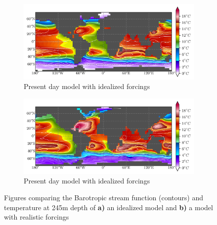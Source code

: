 \documentclass[a4paper]{article}
\begin{document}
\begin{figure}[H]
\begin{subfigure}{1\textwidth}
	\includegraphics[width=\linewidth]{compare/bsf_idealized}
	\caption{Present day model with idealized forcings}
\end{subfigure}
\begin{subfigure}{1\textwidth}
	\includegraphics[width=\linewidth]{compare/bsf_good_forcing}
	\caption{Present day model with idealized forcings}
\end{subfigure}
\caption{Figures comparing the Barotropic stream function (contours) and temperature at 245m depth of \textbf{a)} an idealized model and \textbf{b)} a model with realistic forcings}
\label{fig:bsf_compared}
\end{figure}

\begin{multicols}{2}





\end{multicols}
\end{document}
